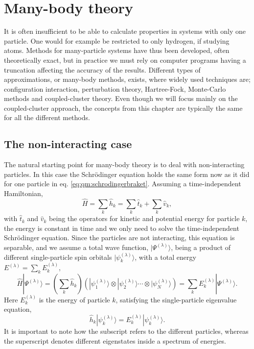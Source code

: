 \chapter{Many-body theory}
It is often insufficient to be able to calculate properties in systems with only one particle.
One would for example be restricted to only hydrogen, if studying atoms.
Methods for many-particle systems have thus been developed, often theoretically exact, but in practice we must rely on computer programs having a truncation affecting the accuracy of the results.
Different types of approximations, or many-body methods, exists, where widely
used techniques are; configuration interaction, perturbation theory, Hartree-Fock, Monte-Carlo methods and coupled-cluster theory.
Even though we will focus mainly on the coupled-cluster approach, the concepts from this chapter are typically the same for all the different methods.


\section{The non-interacting case}
The natural starting point for many-body theory is to deal with non-interacting particles.
In this case the Schrödinger equation holds the same form now as it did for one particle in eq. \eqref{eq:qm:schrodingerbraket}.
Assuming a time-independent Hamiltonian,
\begin{equation}
\hat{H} = \sum_k \hat{h}_k =  \sum_k \hat{t}_k  + \sum_k \hat{v}_k ,
\end{equation}
with $\hat{t}_k$ and $\hat{v}_k$ being the operators for kinetic and potential energy for particle $k$, the energy is constant in time and we only need to solve the time-independent Schrödinger equation.
Since the particles are not interacting, this equation is separable, and we assume a total wave function, $|\Psi^{(\lambda)} \rangle$, being a product of different single-particle spin orbitals $|\psi_k^{(\lambda)}\rangle$, with a total energy $E^{(\lambda)}=\sum_k E_k^{(\lambda)}$,
\begin{equation}
\hat{H}|\Psi^{(\lambda)} \rangle = 
\left(\sum_k \hat{h}_k\right) \left(|\psi_1^{(\lambda)}\rangle \otimes |\psi_2^{(\lambda)}\rangle 
\cdots \otimes |\psi_N^{(\lambda)}\rangle \right)
=  \sum_k E_k^{(\lambda)} |\Psi^{(\lambda)} \rangle .
\end{equation}
Here $E_k^{(\lambda)}$ is the energy of particle $k$, satisfying the single-particle eigenvalue equation,
\begin{equation}
\label{eq:manybody:nonInter}
\hat{h}_k |\psi_k^{(\lambda)} \rangle = E_k^{(\lambda)} |\psi_k^{(\lambda)} \rangle .
\end{equation}
It is important to note how the subscript refers to the different particles, whereas the superscript denotes different eigenstates inside a spectrum of energies.

